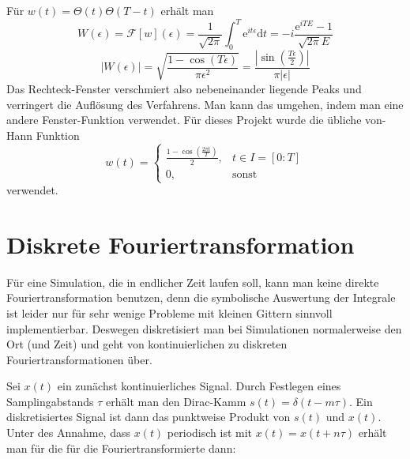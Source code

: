 \documentclass[10pt,a4paper,german]{scrartcl}
\begin{document}
		Für $w(t)=\Theta(t)\Theta(T-t)$ erhält man
		\begin{equation*}
			W(\epsilon) =\mathcal{F}[w](\epsilon) =
				\frac{1}{\sqrt{2\pi}}\int_{0}^{T}	\mathrm{e}^{i t\epsilon} \mathrm{d}t
			= -i \frac{\mathrm{e}^{i T E}-1}{\sqrt{2\pi} E}
		\end{equation*}
		\begin{equation*}
			|W(\epsilon)| = \sqrt{\frac{1-\cos(T \epsilon)}{\pi \epsilon^2}}
			= \frac{|\sin(\frac{T \epsilon}{2})|}{\pi |\epsilon|}
		\end{equation*}
		Das Rechteck-Fenster verschmiert also nebeneinander  liegende Peaks und verringert
		die Auflösung des Verfahrens. Man kann das umgehen, indem man eine andere
		Fenster-Funktion verwendet. Für dieses Projekt wurde die übliche
		von-Hann Funktion
		\begin{equation}
		\label{eq:hann}
			w(t) = \left\{\begin{array}{cl}
				\frac{1-\cos(\frac{2\pi t}{T})}{2}, & t \in I=[0:T]\\
				0,                        & \mbox{sonst}
				\end{array}\right.
		\end{equation}
		verwendet.


  \section{Diskrete Fouriertransformation}
		Für eine Simulation, die in endlicher Zeit laufen soll, kann man keine
		direkte Fouriertransformation benutzen, denn die symbolische Auswertung
		der Integrale ist leider nur für sehr wenige Probleme mit kleinen Gittern
		sinnvoll implementierbar. Deswegen diskretisiert man bei Simulationen
		normalerweise den Ort (und Zeit) und geht von kontinuierlichen zu diskreten
		Fouriertransformationen über.

		Sei $x(t)$ ein zunächst kontinuierliches Signal. Durch Festlegen eines
		Samplingabstands $\tau$ erhält man den Dirac-Kamm $s(t)=\delta(t-m \tau)$.
		Ein diskretisiertes Signal ist dann das punktweise Produkt von $s(t)$ und $x(t)$.
		Unter des Annahme, dass $x(t)$ periodisch ist mit $x(t)=x(t+n\tau)$ erhält
		man für die für die Fouriertransformierte dann:
\end{document}
